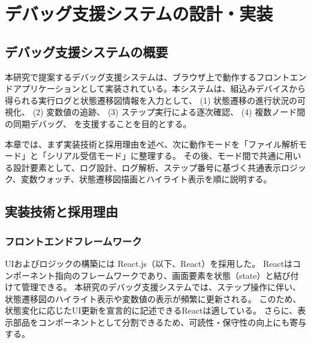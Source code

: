 \documentclass[12pt]{jreport}
\begin{document}
\chapter{デバッグ支援システムの設計・実装}



\section{デバッグ支援システムの概要}
\label{sec:debug_overview}

\begin{par}
本研究で提案するデバッグ支援システムは、ブラウザ上で動作するフロントエンドアプリケーションとして実装されている。本システムは、組込みデバイスから得られる実行ログと状態遷移図情報を入力として、
(1) 状態遷移の進行状況の可視化、
(2) 変数値の追跡、
(3) ステップ実行による逐次確認、
(4) 複数ノード間の同期デバッグ、
を支援することを目的とする。
\end{par}

\begin{par}
本章では、まず実装技術と採用理由を述べ、次に動作モードを「ファイル解析モード」と「シリアル受信モード」に整理する。
その後、モード間で共通に用いる設計要素として、ログ設計、ログ解析、ステップ番号に基づく共通表示ロジック、変数ウォッチ、状態遷移図描画とハイライト表示を順に説明する。
\end{par}

\section{実装技術と採用理由}
\label{sec:tech_reason}

\subsection{フロントエンドフレームワーク}
\begin{par}
UIおよびロジックの構築には React.js（以下、React）を採用した。
Reactはコンポーネント指向のフレームワークであり、画面要素を状態（state）と結び付けて管理できる。
本研究のデバッグ支援システムでは、ステップ操作に伴い、状態遷移図のハイライト表示や変数値の表示が頻繁に更新される。
このため、状態変化に応じたUI更新を宣言的に記述できるReactは適している。
さらに、表示部品をコンポーネントとして分割できるため、可読性・保守性の向上にも寄与する。
\end{par}
\end{document}
